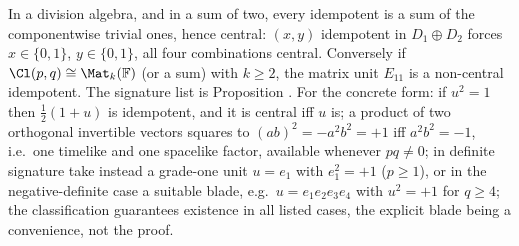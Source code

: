 In a division algebra, and in a sum of two, every idempotent is a sum of the componentwise trivial ones, hence central: $(x,y)$ idempotent in $D_1 \oplus D_2$ forces $x \in \{0,1\}$, $y \in \{0,1\}$, all four combinations central. Conversely if $\Cl(p,q) \cong \Mat_k(\mathbb{F})$ (or a sum) with $k \geq 2$, the matrix unit $E_{11}$ is a non-central idempotent. The signature list is Proposition . For the concrete form: if $u^2 = 1$ then $\tfrac12(1+u)$ is idempotent, and it is central iff $u$ is; a product of two orthogonal invertible vectors squares to $(ab)^2 = -a^2b^2 = +1$ iff $a^2 b^2 = -1$, i.e.\ one timelike and one spacelike factor, available whenever $pq \neq 0$; in definite signature take instead a grade-one unit $u = e_1$ with $e_1^2 = +1$ ($p \geq 1$), or in the negative-definite case a suitable blade, e.g.\ $u = e_1e_2e_3e_4$ with $u^2 = +1$ for $q \geq 4$; the classification guarantees existence in all listed cases, the explicit blade being a convenience, not the proof.
